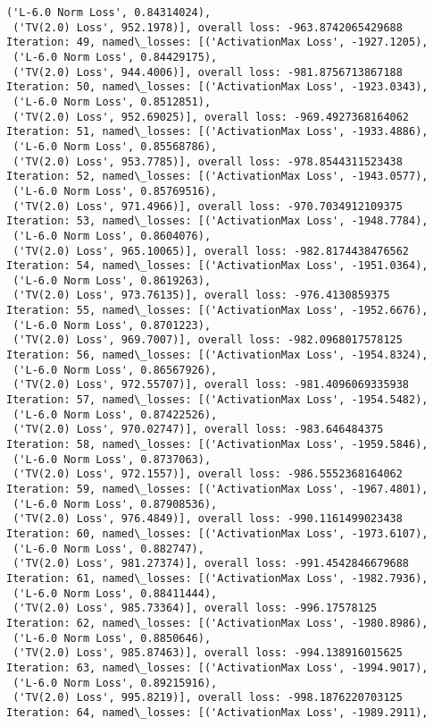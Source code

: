 \documentclass[10pt]{article}
\begin{document}
\begin{Verbatim}[commandchars=\\\{\}]
 ('L-6.0 Norm Loss', 0.84314024),
 ('TV(2.0) Loss', 952.1978)], overall loss: -963.8742065429688
Iteration: 49, named\_losses: [('ActivationMax Loss', -1927.1205),
 ('L-6.0 Norm Loss', 0.84429175),
 ('TV(2.0) Loss', 944.4006)], overall loss: -981.8756713867188
Iteration: 50, named\_losses: [('ActivationMax Loss', -1923.0343),
 ('L-6.0 Norm Loss', 0.8512851),
 ('TV(2.0) Loss', 952.69025)], overall loss: -969.4927368164062
Iteration: 51, named\_losses: [('ActivationMax Loss', -1933.4886),
 ('L-6.0 Norm Loss', 0.85568786),
 ('TV(2.0) Loss', 953.7785)], overall loss: -978.8544311523438
Iteration: 52, named\_losses: [('ActivationMax Loss', -1943.0577),
 ('L-6.0 Norm Loss', 0.85769516),
 ('TV(2.0) Loss', 971.4966)], overall loss: -970.7034912109375
Iteration: 53, named\_losses: [('ActivationMax Loss', -1948.7784),
 ('L-6.0 Norm Loss', 0.8604076),
 ('TV(2.0) Loss', 965.10065)], overall loss: -982.8174438476562
Iteration: 54, named\_losses: [('ActivationMax Loss', -1951.0364),
 ('L-6.0 Norm Loss', 0.8619263),
 ('TV(2.0) Loss', 973.76135)], overall loss: -976.4130859375
Iteration: 55, named\_losses: [('ActivationMax Loss', -1952.6676),
 ('L-6.0 Norm Loss', 0.8701223),
 ('TV(2.0) Loss', 969.7007)], overall loss: -982.0968017578125
Iteration: 56, named\_losses: [('ActivationMax Loss', -1954.8324),
 ('L-6.0 Norm Loss', 0.86567926),
 ('TV(2.0) Loss', 972.55707)], overall loss: -981.4096069335938
Iteration: 57, named\_losses: [('ActivationMax Loss', -1954.5482),
 ('L-6.0 Norm Loss', 0.87422526),
 ('TV(2.0) Loss', 970.02747)], overall loss: -983.646484375
Iteration: 58, named\_losses: [('ActivationMax Loss', -1959.5846),
 ('L-6.0 Norm Loss', 0.8737063),
 ('TV(2.0) Loss', 972.1557)], overall loss: -986.5552368164062
Iteration: 59, named\_losses: [('ActivationMax Loss', -1967.4801),
 ('L-6.0 Norm Loss', 0.87908536),
 ('TV(2.0) Loss', 976.4849)], overall loss: -990.1161499023438
Iteration: 60, named\_losses: [('ActivationMax Loss', -1973.6107),
 ('L-6.0 Norm Loss', 0.882747),
 ('TV(2.0) Loss', 981.27374)], overall loss: -991.4542846679688
Iteration: 61, named\_losses: [('ActivationMax Loss', -1982.7936),
 ('L-6.0 Norm Loss', 0.88411444),
 ('TV(2.0) Loss', 985.73364)], overall loss: -996.17578125
Iteration: 62, named\_losses: [('ActivationMax Loss', -1980.8986),
 ('L-6.0 Norm Loss', 0.8850646),
 ('TV(2.0) Loss', 985.87463)], overall loss: -994.138916015625
Iteration: 63, named\_losses: [('ActivationMax Loss', -1994.9017),
 ('L-6.0 Norm Loss', 0.89215916),
 ('TV(2.0) Loss', 995.8219)], overall loss: -998.1876220703125
Iteration: 64, named\_losses: [('ActivationMax Loss', -1989.2911),

\end{Verbatim}
\end{document}
